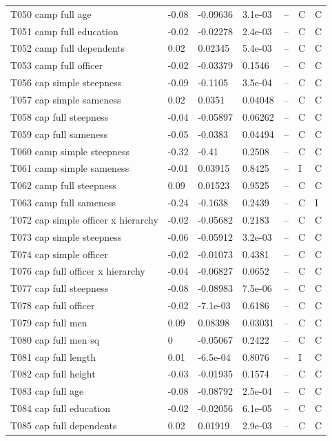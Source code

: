 {\begin{longtable}{@{}p{.245\linewidth}p{.17\linewidth}p{.17\linewidth}p{.085\linewidth}p{.060\linewidth}p{.08\linewidth}p{.07\linewidth}@{}}
T050 camp full age & -0.08 & -0.09636 & 3.1e-03 & -- & C & C\\
T051 camp full education & -0.02 & -0.02278 & 2.4e-03 & -- & C & C\\
T052 camp full dependents & 0.02 & 0.02345 & 5.4e-03 & -- & C & C\\
T053 camp full officer & -0.02 & -0.03379 & 0.1546 & -- & C & C\\
T056 cap simple steepness & -0.09 & -0.1105 & 3.5e-04 & -- & C & C\\
T057 cap simple sameness & 0.02 & 0.0351 & 0.04048 & -- & C & C\\
T058 cap full steepness & -0.04 & -0.05897 & 0.06262 & -- & C & C\\
T059 cap full sameness & -0.05 & -0.0383 & 0.04494 & -- & C & C\\
T060 camp simple steepness & -0.32 & -0.41 & 0.2508 & -- & C & C\\
T061 camp simple sameness & -0.01 & 0.03915 & 0.8425 & -- & I & C\\
T062 camp full steepness & 0.09 & 0.01523 & 0.9525 & -- & C & C\\
T063 camp full sameness & -0.24 & -0.1638 & 0.2439 & -- & C & I\\
T072 cap simple officer x hierarchy & -0.02 & -0.05682 & 0.2183 & -- & C & C\\
T073 cap simple steepness & -0.06 & -0.05912 & 3.2e-03 & -- & C & C\\
T074 cap simple officer & -0.02 & -0.01073 & 0.4381 & -- & C & C\\
T076 cap full officer x hierarchy & -0.04 & -0.06827 & 0.0652 & -- & C & C\\
T077 cap full steepness & -0.08 & -0.08983 & 7.5e-06 & -- & C & C\\
T078 cap full officer & -0.02 & -7.1e-03 & 0.6186 & -- & C & C\\
T079 cap full men & 0.09 & 0.08398 & 0.03031 & -- & C & C\\
T080 cap full men sq & 0 & -0.05067 & 0.2422 & -- & C & C\\
T081 cap full length & 0.01 & -6.5e-04 & 0.8076 & -- & I & C\\
T082 cap full height & -0.03 & -0.01935 & 0.1574 & -- & C & C\\
T083 cap full age & -0.08 & -0.08792 & 2.5e-04 & -- & C & C\\
T084 cap full education & -0.02 & -0.02056 & 6.1e-05 & -- & C & C\\
T085 cap full dependents & 0.02 & 0.01919 & 2.9e-03 & -- & C & C\\

\end{longtable}}

